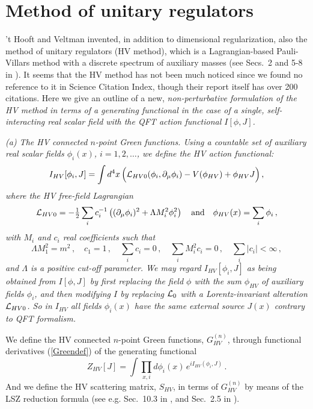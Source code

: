 \documentclass[a4paper,12pt]{article}
\newcommand{\half}{{\textstyle{1\over2}}}
\newcommand{\polje}{\phi}
\newcommand{\polR}{\polje_{HV}}
\newcommand{\akcija}{I}
\newcommand{\akcijaR}{\akcija_{HV}}
\newcommand{\Lag}{{\cal L}}
\newcommand{\Lagf}{\Lag_{0}}
\newcommand{\Lagi}{V}
\newcommand{\LagRf}{\Lag_{HV0}}
\newcommand{\Gf}{G^{(n)}}
\newcommand{\GfR}{\Gf_{HV}}
\newcommand{\SmR}{S_{HV}}
\begin{document}
\section{Method of unitary regulators}
\label{secunireg}

't Hooft and Veltman invented, in addition to dimensional regularization, also the method of unitary regulators (HV method), which is a Lagrangian-based Pauli-Villars method with a discrete spectrum of auxiliary masses (see Secs.~2 and 5-8 in \cite{Hooft}). It seems that the HV method  has not been much noticed since we found no reference to it in Science Citation Index, though their report \cite{Hooft} itself has over 200 citations. Here we give an outline of a new, \it non-perturbative formulation \rm of the HV method in terms of a generating functional in the case of a single, self-interacting real scalar field with the QFT action functional $\akcija[\polje,J]$.

\it (a) The HV connected $n$-point Green functions. \rm Using a countable set of auxiliary real scalar fields $\polje_i(x)$, $i = 1, 2, \ldots$, we define the \it HV action functional: \rm
\begin{equation}
   \akcijaR[\polje_i,J] = \int d^4x \, \Bigl( \LagRf(\polje_i, \partial_\mu \polje_i) - \Lagi(\polR) + \polR J \Bigr) \,,
   \label{Raction}
\end{equation}
where the HV free-field Lagrangian
\begin{equation}
   \LagRf = - \half \sum_{i} c_i^{-1} \left ( (\partial_\mu \polje_i)^2 + \Lambda M_i^2 \polje_i^2 \right ) \quad\hbox{and}\quad
   \polR(x) = \sum_i \polje_i \,,
   \label{Rfreelagr}
\end{equation}
with $M_i$ and $c_i$ real coefficients such that 
\begin{equation}
   \Lambda M_1^2 = m^2 \,, \quad c_1 = 1 \,, \quad \sum_i c_i = 0 \,, \quad \sum_i M_i^2 c_i = 0 \,, \quad \sum_i | c_i | < \infty \,,
   \label{concpogoj}
\end{equation}
and $\Lambda$ is a positive cut-off parameter. We may regard $\akcijaR[\polje_i,J]$ as being obtained from $\akcija[\polje,J]$ by first replacing the field $\polje$ with the sum $\polR$ of auxiliary fields $\polje_i$, and then modifying $\akcija$ by replacing $\Lagf$ with a Lorentz-invariant alteration $\LagRf$. So in $\akcijaR$ \it all fields $\polje_i(x)$ have the same external source $J(x)$ \rm contrary to QFT formalism.

We define the HV connected $n$-point Green functions, $\GfR$, through functional derivatives (\ref{Greendef}) of the generating functional
\begin{equation}
   Z_{HV}[J] = \int \prod_{x,i} d\polje_i(x) \, e^{ i\akcijaR(\polje_i, J) } \,.
  \label{unigenfunc}
\end{equation}
And we define the HV scattering matrix, $\SmR$, in terms of $\GfR$ by means of the LSZ reduction formula (see e.g. Sec.~10.3 in \cite{Weinberg}, and Sec.~2.5 in \cite{Hooft}).
\end{document}
